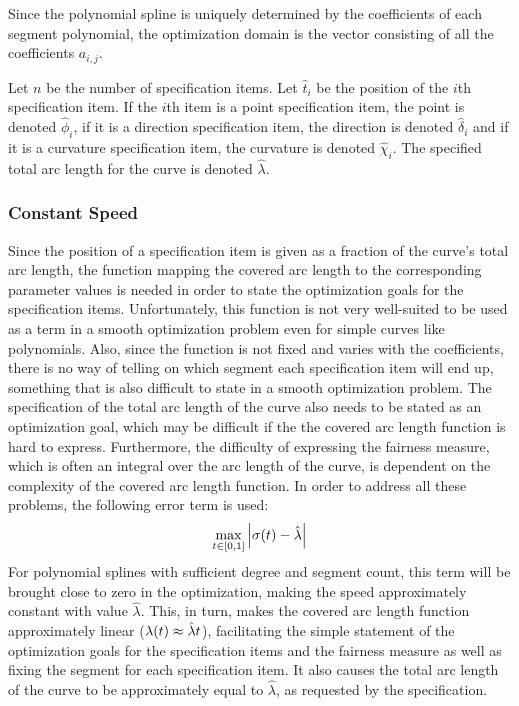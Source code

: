 \documentclass[a4paper]{article}
\begin{document}
				Since the polynomial spline is uniquely determined by the coefficients of each segment polynomial, the optimization domain is the vector consisting of all the coefficients \(a_{i,j}\).

				Let \(n\) be the number of specification items. Let \(\hat{t}_i\) be the position of the \(i\)th specification item. If the \(i\)th item is a point specification item, the point is denoted \(\hat{\phi}_i\), if it is a direction specification item, the direction is denoted \(\hat{\delta}_i\) and if it is a curvature specification item, the curvature is denoted \(\hat{\chi}_i\). The specified total arc length for the curve is denoted \(\hat{\lambda}\).

			\subsubsection{Constant Speed}
			\label{section:constant_speed}

				Since the position of a specification item is given as a fraction of the curve's total arc length, the function mapping the covered arc length to the corresponding parameter values is needed in order to state the optimization goals for the specification items. Unfortunately, this function is not very well-suited to be used as a term in a smooth optimization problem even for simple curves like polynomials. Also, since the function is not fixed and varies with the coefficients, there is no way of telling on which segment each specification item will end up, something that is also difficult to state in a smooth optimization problem. The specification of the total arc length of the curve also needs to be stated as an optimization goal, which may be difficult if the the covered arc length function is hard to express. Furthermore, the difficulty of expressing the fairness measure, which is often an integral over the arc length of the curve, is dependent on the complexity of the covered arc length function. In order to address all these problems, the following error term is used:
				\begin{equation*}
					\max_{t \in \left[ 0,1 \right]} \left| \sigma\!\left( t \right) - \hat{\lambda} \right|
				\end{equation*}
				For polynomial splines with sufficient degree and segment count, this term will be brought close to zero in the optimization, making the speed approximately constant with value \(\hat{\lambda}\). This, in turn, makes the covered arc length function approximately linear (\(\lambda\!\left( t \right) \approx \hat{\lambda}t\)), facilitating the simple statement of the optimization goals for the specification items and the fairness measure as well as fixing the segment for each specification item. It also causes the total arc length of the curve to be approximately equal to \(\hat{\lambda}\), as requested by the specification.
\end{document}
